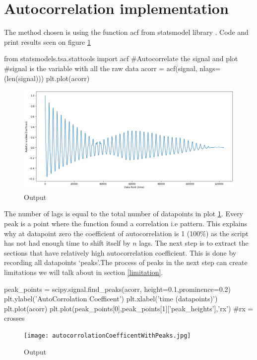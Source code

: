 \raggedright
\section{Autocorrelation implementation}
The method chosen is using the function acf from statsmodel library \cite{statsmodel}. Code and print results seen on figure \ref{a}

\begin{python}
from statsmodels.tsa.stattools import acf
#Autocorrelate the signal and plot
#signal is the variable with all the raw data
acorr = acf(signal, nlags=(len(signal)))
plt.plot(acorr)
\end{python}

\begin{figure}[h]
\includegraphics[scale=0.45]{images/autocorrolationCoefficent.png}
\caption{Output}
\label{a}
\end{figure}
The number of lags is equal to the total number of datapoints in plot \ref{a}.
Every peak is a point where the function found a correlation i.e pattern. This explains why at datapoint zero the coefficient of autocorrelation is 1 (100\%) as the script has not had enough time to shift itself by $n$ lags.
The next step is to extract the sections that have relatively high autocorrelation coefficient. This is done by recording all datapoints `peaks'.The process of peaks in the next step can create limitations we will talk about in section \ref{limitation}.


\begin{python}
peak_points = scipy.signal.find_peaks(acorr, height=0.1,prominence=0.2)
plt.ylabel('AutoCorrolation Coefficent')
plt.xlabel('time (datapoints)')
plt.plot(acorr)
plt.plot(peak_points[0],peak_points[1]['peak_heights'],'rx') 
#rx = crosses
\end{python}

\begin{figure}[h]

\texttt{[image: autocorrolationCoefficentWithPeaks.jpg]}
\caption{Output}
\label{autocorrolaiton with peaks}
\end{figure}

